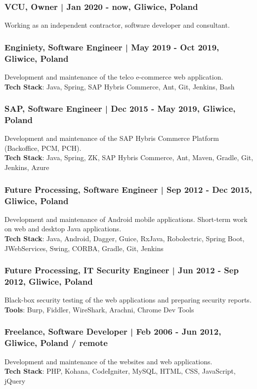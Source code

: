 \documentclass[8pt]{extarticle}
\begin{document}
      \subsubsection*{\normalsize{VCU, Owner | Jan 2020 - now, Gliwice, Poland}}
      Working as an independent contractor, software developer and consultant.

      \subsubsection*{\normalsize{Enginiety, Software Engineer | May 2019 - Oct 2019, Gliwice, Poland}}
      Development and maintenance of the telco e-commerce web application.\\
      \textbf{Tech Stack}: Java, Spring, SAP Hybris Commerce, Ant, Git, Jenkins, Bash

      \subsubsection*{\normalsize{SAP, Software Engineer | Dec 2015 - May 2019, Gliwice, Poland}}
      Development and maintenance of the SAP Hybris Commerce Platform (Backoffice, PCM, PCH).\\
      \textbf{Tech Stack}: Java, Spring, ZK, SAP Hybris Commerce, Ant, Maven, Gradle, Git, Jenkins, Azure

      \subsubsection*{\normalsize{Future Processing, Software Engineer | Sep 2012 - Dec 2015, Gliwice, Poland}}
      Development and maintenance of Android mobile applications. Short-term work on web and desktop Java applications.\\
      \textbf{Tech Stack}: Java, Android, Dagger, Guice, RxJava, Robolectric, Spring Boot, JWebServices,
      Swing, CORBA, Gradle, Git, Jenkins

      \subsubsection*{\normalsize{Future Processing, IT Security Engineer | Jun 2012 - Sep 2012, Gliwice, Poland}}
      Black-box security testing of the web applications and preparing security reports.\\
      \textbf{Tools}: Burp, Fiddler, WireShark, Arachni, Chrome Dev Tools

      \subsubsection*{\normalsize{Freelance, Software Developer | Feb 2006 - Jun 2012, Gliwice, Poland / remote}}
      Development and maintenance of the websites and web applications.\\
      \textbf{Tech Stack}: PHP, Kohana, CodeIgniter, MySQL, HTML, CSS, JavaScript, jQuery
\end{document}
